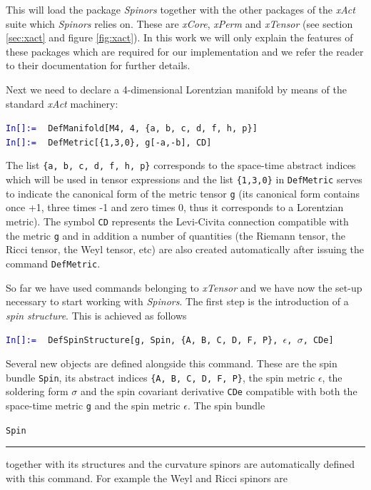 \documentclass[final,3p,times,twocolumn]{elsarticle}
\newcommand{\dd}{\;\rule{0.018cm}{.15cm}\!\raisebox{1mm}{\rule{0.08cm}{.02cm}}}
\newcommand{\icode}[1]{{\scriptsize\tt #1}}
\newcounter{mathex}
\newcommand{\Mathsize}{\scriptsize}
\newcommand{\MathIn}[2]{ {\textcolor{blue}{\tt In[\arabic{#1}]:=} }\ { \tt #2 } \\[1mm] }
\begin{document}
\noindent
This will load the package {\em Spinors} together with the other packages of the {\em xAct} suite which {\em Spinors} relies on. These are {\em xCore}, {\em xPerm} and 
{\em xTensor} 
(see section \ref{sec:xact} and figure \ref{fig:xact}). 
In this work we will only explain the features of these packages which are required for our implementation and
we refer the reader to their documentation for further details. 

Next we need to declare a 4-dimensional Lorentzian manifold by means of the standard  
{\em xAct} machinery:

\begin{flushleft}
\Mathsize
{}
\MathIn{mathex}{DefManifold[M4, 4, \{a, b, c, d, f, h, p\}]}
\MathIn{mathex}{DefMetric[\{1,3,0\}, g[-a,-b], CD]}
\end{flushleft}

\noindent
The list \icode{\{a, b, c, d, f, h, p\}} corresponds to the space-time abstract
indices which will be used in tensor expressions and the list \icode{\{1,3,0\}}
in \icode{DefMetric} serves to indicate the canonical form of the metric tensor
\icode{g} (its canonical form contains once +1, three times -1 and zero times 0,
thus it corresponds to a Lorentzian metric). The symbol \icode{CD} represents
the Levi-Civita connection compatible with the metric \icode{g} and in addition
a number of quantities (the Riemann tensor, the Ricci tensor, the Weyl tensor,
etc) are also created automatically after issuing the command \icode{DefMetric}.

So far we have used commands belonging to {\em xTensor} and we have now the
set-up necessary to start working with {\em Spinors}. The first step is the
introduction of a {\em spin structure}. This is achieved as follows 

\begin{flushleft}
\Mathsize
{}
\MathIn{mathex}{DefSpinStructure[g, Spin, \{A, B, C, D, F, P\}, $\epsilon$, $\sigma$, CDe]}
\end{flushleft}

\noindent
Several new objects are defined alongside this command. These are the spin
bundle \icode{Spin}, its abstract indices \icode{\{A, B, C, D, F, P\}},
the spin metric \icode{$\epsilon$}, the soldering form \icode{$\sigma$}
and the spin covariant derivative \icode{CDe} compatible with both the
space-time metric \icode{g} and the spin metric \icode{$\epsilon$}.
The spin bundle \icode{Spin\dd} together with 
its structures and the curvature spinors are automatically defined with 
this command. 
For example the Weyl and Ricci spinors are 
\end{document}
